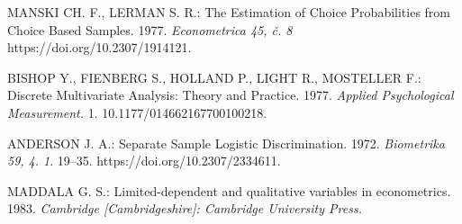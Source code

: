 \begin{thebibliography}{99}
     MANSKI CH. F., LERMAN S. R.: The Estimation of Choice Probabilities from Choice Based Samples. 1977. \emph{Econometrica 45, č. 8} https://doi.org/10.2307/1914121.

     BISHOP Y., FIENBERG S., HOLLAND P., LIGHT R., MOSTELLER F.: Discrete Multivariate Analysis: Theory and Practice. 1977. \emph{Applied Psychological Measurement.} 1. 10.1177/014662167700100218.

     ANDERSON J. A.: Separate Sample Logistic Discrimination. 1972. \emph{Biometrika 59, 4. 1}. 19–35. https://doi.org/10.2307/2334611.

     MADDALA G. S.: Limited-dependent and qualitative variables in econometrics. 1983. \emph{Cambridge [Cambridgeshire]: Cambridge University Press.}

\end{thebibliography}
